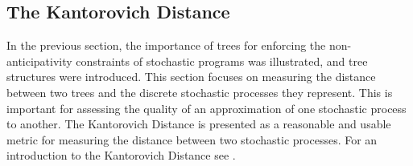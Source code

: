\begin{comment}
The most common way to think about stochastic processes is, however, in terms of its probability measure $\mathbb{P}$.
For the purpose of this discussion, let $\Omega=\mathbb{R}^n$ and $\zeta=id$.
Each of the elements of the stochastic process except for the probability measure is fixed, and the stochastic process is considered in terms of the space of probability measures.
This interpretation will be followed throughout this paper.

The choice of the space of probability measures as the underlying space for stochastic processes leads to much more difficulties when defining a metric.
It is not feasible to regard two probability measures $\mathbb{P}_1$ and $\mathbb{P}_2$ as integrable functions and elements of $L^p$ for two reasons:
\begin{enumerate}
\item The metric between two stochastic processes $\xi_1$ and $\xi_2$ would be defined in terms of the $L^p$-norm between their probability measures $\mathbb{P}_1$ and $\mathbb{P}_2$:
  \begin{equation}
    \label{eq:prob-measure-metric-as-Lpnorm}
    D(\mathbb{P}_1,\mathbb{P}_2) := \left\Vert \mathbb{P}_1-\mathbb{P}_2\right\Vert = \sum_{t=1}^T\int_{\omega\in\Omega}\left\Vert \mathbb{P}_{1,t}(\omega)-\mathbb{P}_{2,t}(\omega)\right\Vert
  \end{equation}
  This does, however, not yield meaningful results.
See figure \ref{fig:example-wrong-distance} for an example.
\item The definition of the above metric makes use of the point wise difference of $\mathbb{P}_1$ and $\mathbb{P}_2$
  This difference is, however, not a meaningful construction, since the difference of two probability measure functions is itself \textbf{never} a probability measure.
\end{enumerate}

\end{comment}
\subsection{The Kantorovich Distance}
\label{sec:kantoro}
In the previous section, the importance of trees for enforcing the non-anticipativity constraints of stochastic programs was illustrated, and tree structures were introduced.
This section focuses on measuring the distance between two trees and the discrete stochastic processes they represent.
This is important for assessing the quality of an approximation of one stochastic process to another.
The Kantorovich Distance is presented as a reasonable and usable metric for measuring the distance between two stochastic processes.
For an introduction to the Kantorovich Distance see .

